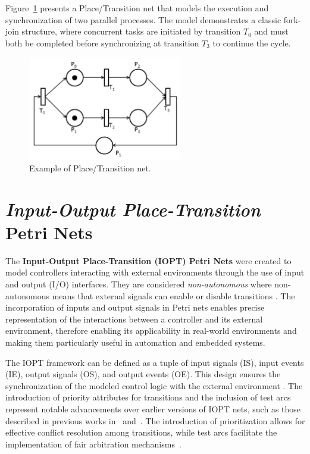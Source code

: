 Figure~\ref{fig:petrinet} presents a Place/Transition net that models the execution and synchronization of two parallel processes. The model demonstrates a classic fork-join structure, where concurrent tasks are initiated by transition $T_0$ and must both be completed before synchronizing at transition $T_3$ to continue the cycle.


\begin{figure}[htbp]
  \centering
  \includegraphics[width=0.6\textwidth]{Chapters/Figures/petriNetExemplo.jpg}
  \caption{Example of Place/Transition net.}
  \label{fig:petrinet}
\end{figure}

\section{\emph{Input-Output Place-Transition} Petri Nets}
\label{sec:iopt_petri_nets}


The \textbf{Input-Output Place-Transition (IOPT) Petri Nets} were created to model controllers interacting with external environments through the use of input and output (I/O) interfaces\cite{iopttools}. They are considered \emph{non-autonomous}  where non-autonomous means that external signals can enable or disable transitions \cite{2015gomes}. The incorporation of inputs and output signals in Petri nets enables precise representation of the interactions between a controller and its external environment, therefore enabling its applicability in real-world environments  and making them particularly useful in automation and embedded systems\cite{iopttools}.


The IOPT framework can be defined as a tuple of input signals (IS), input events (IE), output signals (OS), and output events (OE). This design ensures the synchronization of the modeled control logic with the external environment \cite{iopttools}. The introduction of priority attributes for transitions and the inclusion of test arcs represent notable advancements over earlier versions of IOPT nets, such as those described in previous works in~\cite{barros2004} and~\cite{bg2005}. The introduction of prioritization allows for effective conflict resolution among transitions, while test arcs facilitate the implementation of fair arbitration mechanisms~\cite{conflict}.

